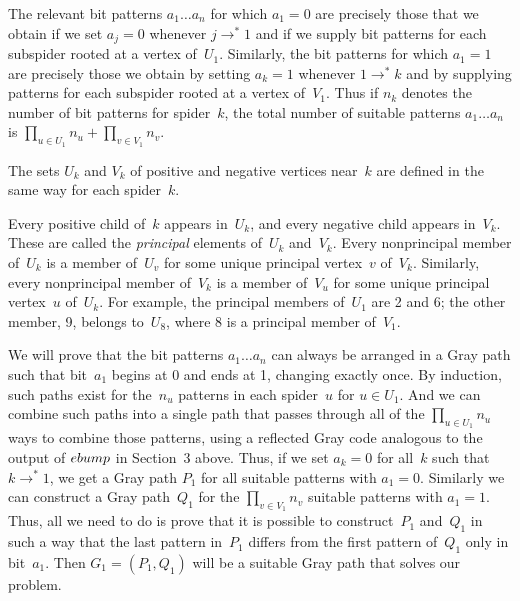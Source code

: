 The relevant bit patterns $a_1\ldots a_n$ for which $a_1=0$
are precisely those that we obtain if 
we set $a_j=0$ whenever $j\to ^*1$ and if we supply bit
patterns for each subspider rooted at 
a vertex of~$U_1$.  Similarly, the bit patterns for which
$a_1=1$ are precisely those we obtain 
by setting $a_k=1$ whenever $1\to ^*k$ and by supplying
patterns for each subspider rooted at a 
vertex of~$V_1$.
Thus if $n_k$ denotes the number of bit patterns for
spider~$k$, the total number of suitable 
patterns $a_1\ldots a_n$ is $\prod_{u\in U_1} n_u
+\prod_{v\in V_1} n_v$.

The sets $U_k$ and $V_k$ of positive and negative vertices
near~$k$ are defined in the same 
way for each spider~$k$.

Every positive child of~$k$ appears in~$U_k$, and every
negative child appears in~$V_k$.  
These are called the {\it principal\/} elements of~$U_k$
and~$V_k$.  Every nonprincipal member 
of~$U_k$ is a member of~$U_v$ for some unique principal
vertex~$v$ of~$V_k$.  Similarly, 
every nonprincipal member of~$V_k$ is a member of~$V_u$ for
some unique principal 
vertex~$u$ of~$U_k$.  For example, the principal members
of~$U_1$ are 2 and 6; the other 
member, 9, belongs to~$U_8$, where 8 is a principal member
of~$V_1$.

We will prove that the bit patterns $a_1\ldots a_n$ can
always be arranged in a Gray path such 
that bit~$a_1$ begins at 0 and ends at 1, changing exactly
once.  By induction, such paths exist 
for the~$n_u$ patterns in each spider~$u$ for $u\in U_1$.
And we can combine such paths 
into a single path that passes through all of the $\prod_{u\in U_1} n_u$
ways to combine those patterns, using a
reflected Gray code analogous to 
the output of $\\{ebump}$ in Section~3 above.  Thus, if we
set $a_k=0$ for all~$k$ such that 
$k\to ^*1$, we get a Gray path $P_1$ for all suitable
patterns with $a_1=0$.  Similarly we can 
construct a Gray path~$Q_1$ for the $\prod_{v\in V_1} n_v$
suitable patterns with $a_1=1$.  Thus, all
we need to do is prove that it is possible to
construct~$P_1$ and~$Q_1$ in such a way that the 
last pattern in~$P_1$ differs from the first pattern
of~$Q_1$ only in bit~$a_1$.  Then 
$G_1=(P_1,Q_1)$ will be a suitable Gray path that solves our problem.


